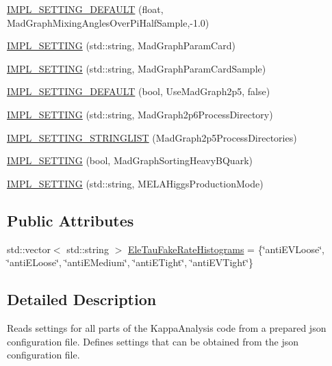 \begin{DoxyCompactItemize}
\item 
\hyperlink{classHttSettings_a590977f27bcdf90a9ff244eb663a02c9}{IMPL\_\-SETTING\_\-DEFAULT} (float, MadGraphMixingAnglesOverPiHalfSample,-\/1.0)
\item 
\hyperlink{classHttSettings_ab215ffcb567aceff98b8289457827490}{IMPL\_\-SETTING} (std::string, MadGraphParamCard)
\item 
\hyperlink{classHttSettings_a5c88b182940146dcefaf3625c16ab3e4}{IMPL\_\-SETTING} (std::string, MadGraphParamCardSample)
\item 
\hyperlink{classHttSettings_aa918600ec8b73732b5a6432fef753e34}{IMPL\_\-SETTING\_\-DEFAULT} (bool, UseMadGraph2p5, false)
\item 
\hyperlink{classHttSettings_a1eeccbffbcab60449a06a669d164d79c}{IMPL\_\-SETTING} (std::string, MadGraph2p6ProcessDirectory)
\item 
\hyperlink{classHttSettings_adcce9324c375db2a5fe223eb85216ecd}{IMPL\_\-SETTING\_\-STRINGLIST} (MadGraph2p5ProcessDirectories)
\item 
\hyperlink{classHttSettings_a20711c4a2bda634227ba9127f37cc97f}{IMPL\_\-SETTING} (bool, MadGraphSortingHeavyBQuark)
\item 
\hyperlink{classHttSettings_af49255f4051c7dcb6547ece3b3a2cff5}{IMPL\_\-SETTING} (std::string, MELAHiggsProductionMode)
\end{DoxyCompactItemize}
\subsection*{Public Attributes}
\begin{DoxyCompactItemize}
\item 
std::vector$<$ std::string $>$ \hyperlink{classHttSettings_ae13115ebff12caecd683ea97cadecafc}{EleTauFakeRateHistograms} = \{\char`\"{}antiEVLoose\char`\"{}, \char`\"{}antiELoose\char`\"{}, \char`\"{}antiEMedium\char`\"{}, \char`\"{}antiETight\char`\"{}, \char`\"{}antiEVTight\char`\"{}\}
\end{DoxyCompactItemize}


\subsection{Detailed Description}
Reads settings for all parts of the KappaAnalysis code from a prepared json configuration file. Defines settings that can be obtained from the json configuration file. 


